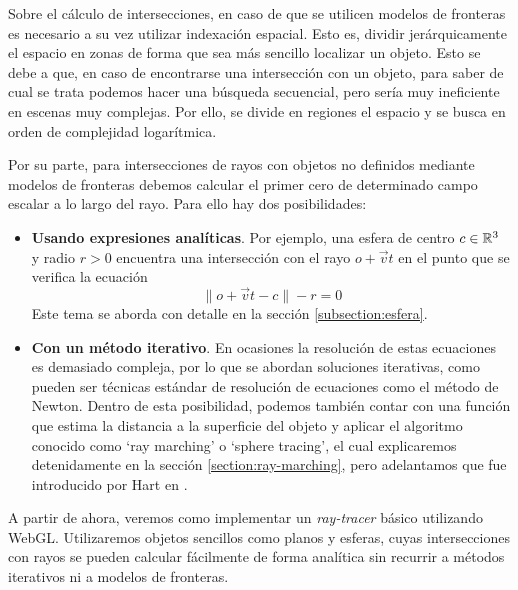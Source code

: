 Sobre el cálculo de intersecciones, en caso de que se utilicen modelos de fronteras es necesario a su vez utilizar indexación espacial. Esto es, dividir jerárquicamente el espacio en zonas de forma que sea más sencillo localizar un objeto. Esto se debe a que, en caso de encontrarse una intersección con un objeto, para saber de cual se trata podemos hacer una búsqueda secuencial, pero sería muy ineficiente en escenas muy complejas. Por ello, se divide en regiones el espacio y se busca en orden de complejidad logarítmica.

Por su parte, para intersecciones de rayos con objetos no definidos mediante modelos de fronteras debemos calcular el primer cero de determinado campo escalar a lo largo del rayo. Para ello hay dos posibilidades:
\begin{itemize}
    \item \textbf{Usando expresiones analíticas}. Por ejemplo, una esfera de centro $c\in\mathbb{R}^3$ y radio $r>0$ encuentra una intersección con el rayo $o+\vec v t$ en el punto que se verifica la ecuación
    $$
    \|o+\vec v t - c\| - r = 0
    $$
    Este tema se aborda con detalle en la sección \ref{subsection:esfera}.
    \item \textbf{Con un método iterativo}. En ocasiones la resolución de estas ecuaciones es demasiado compleja, por lo que se abordan soluciones iterativas, como pueden ser técnicas estándar de resolución de ecuaciones como el método de Newton. Dentro de esta posibilidad, podemos también contar con una función que estima la distancia a la superficie del objeto y aplicar el algoritmo conocido como `ray marching' o `sphere tracing', el cual explicaremos detenidamente en la sección \ref{section:ray-marching}, pero adelantamos que fue introducido por Hart en \cite{Hart-1995}.
\end{itemize}

A partir de ahora, veremos como implementar un \textit{ray-tracer} básico utilizando WebGL. Utilizaremos objetos sencillos como planos y esferas, cuyas intersecciones con rayos se pueden calcular fácilmente de forma analítica sin recurrir a métodos iterativos ni a modelos de fronteras.

